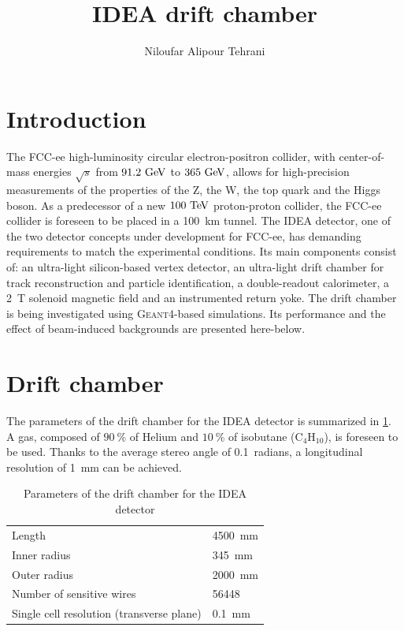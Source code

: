 \documentclass{article}
\begin{document}
\title{IDEA drift chamber}
\author{Niloufar Alipour Tehrani}

\maketitle

\section{Introduction}
The FCC-ee high-luminosity circular electron-positron collider, with center-of-mass energies $\sqrt{s}$ from $91.2\,\mathrm{\,Ge\kern -0.1em V}$ to
$365\,\mathrm{\,Ge\kern -0.1em V}$, allows for high-precision measurements of the properties of the Z, the W, the top quark and the Higgs boson. As a predecessor of a new $100\,\mathrm{\,Te\kern -0.1em V}$ proton-proton collider, the FCC-ee collider is foreseen to be placed in a 100~km tunnel. The IDEA detector, one of the two detector concepts under development for FCC-ee, has demanding requirements to match the experimental conditions. Its main components consist of: an ultra-light silicon-based vertex detector, an ultra-light drift chamber for track reconstruction and particle identification, a double-readout calorimeter, a 2~T solenoid magnetic field and an instrumented return yoke. The drift chamber is being investigated using \textsc{Geant4}-based simulations. Its performance and the effect of beam-induced backgrounds are presented here-below.


\section{Drift chamber}
The parameters of the drift chamber for the IDEA detector is summarized in \cref{driftChamberParams}. A gas, composed of $90~\%$ of Helium and $10~\%$ of isobutane ($\text{C}_{4}\text{H}_{10}$), is foreseen to be used. Thanks to the average stereo angle of 0.1~radians, a longitudinal resolution of 1~mm can be achieved.

\begin{table}[!t]
	\renewcommand{\arraystretch}{1.3}
	\caption{Parameters of the drift chamber for the IDEA detector}
	\label{driftChamberParams}
	\centering
	\begin{tabular}{l l}
		\toprule
		Length & 4500~mm \\
        Inner radius & 345~mm \\
        Outer radius & 2000~mm\\
        Number of sensitive wires & 56448 \\
        Single cell resolution (transverse plane) & 0.1~mm \\
		\bottomrule
	\end{tabular}
\end{table}
\end{document}
